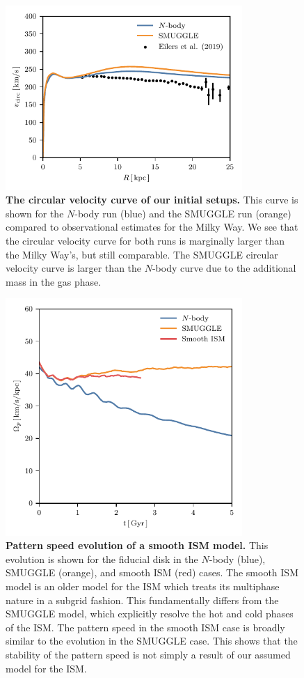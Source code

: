 \documentclass{natureprintstyle}
\newcommand{\Nbody}{$N$-body}
\begin{document}
\begin{figure}[t]%
\centering
\includegraphics[width=9cm]{fig/fig-vcirc.pdf}
\caption{\textbf{The circular velocity curve of our initial setups.} This
curve is shown for the \Nbody{} run (blue) and the SMUGGLE run (orange)
compared to observational estimates for the Milky
Way.\cite{2019ApJ...871..120E} We see that the circular velocity curve for
both runs is marginally larger than the Milky Way's, but still comparable. The
SMUGGLE circular velocity curve is larger than the \Nbody{} curve due to the
additional mass in the gas phase.}
\label{fig:vcirc}
\end{figure}

\begin{figure}[h!]%
\centering
\includegraphics[width=9cm]{fig/fig-GFM.pdf}
\caption{\textbf{Pattern speed evolution of a smooth ISM model.} This
evolution is shown for the fiducial disk in the \Nbody{} (blue), SMUGGLE
(orange), and smooth ISM (red) cases. The smooth ISM model is an older model
for the ISM which treats its multiphase nature in a subgrid
fashion.\cite{2003MNRAS.339..289S} This fundamentally differs from the SMUGGLE
model, which explicitly resolve the hot and cold phases of the
ISM.\cite{2019MNRAS.489.4233M} The pattern speed in the smooth ISM case is
broadly similar to the evolution in the SMUGGLE case. This shows that the
stability of the pattern speed is not simply a result of our assumed model for
the ISM.}
\label{fig:GFM}
\end{figure}
\end{document}
